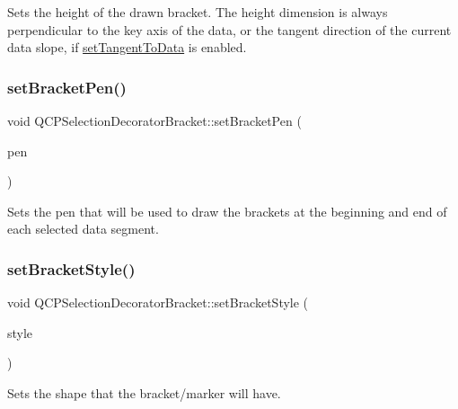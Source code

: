 Sets the height of the drawn bracket. The height dimension is always perpendicular to the key axis of the data, or the tangent direction of the current data slope, if \hyperlink{class_q_c_p_selection_decorator_bracket_a93bc6086e53a5e40a08641a7b2e2cdd5}{set\+Tangent\+To\+Data} is enabled. \mbox{\label{class_q_c_p_selection_decorator_bracket_ac0e392a6097990f8aa978932a8fa05d6}} 
\subsubsection{\texorpdfstring{set\+Bracket\+Pen()}{setBracketPen()}}
{\footnotesize\ttfamily void Q\+C\+P\+Selection\+Decorator\+Bracket\+::set\+Bracket\+Pen (\begin{DoxyParamCaption}\item[{const Q\+Pen \&}]{pen }\end{DoxyParamCaption})}

Sets the pen that will be used to draw the brackets at the beginning and end of each selected data segment. \mbox{\label{class_q_c_p_selection_decorator_bracket_a04507697438f6ad8cc2aeea5422dcbe5}} 
\subsubsection{\texorpdfstring{set\+Bracket\+Style()}{setBracketStyle()}}
{\footnotesize\ttfamily void Q\+C\+P\+Selection\+Decorator\+Bracket\+::set\+Bracket\+Style (\begin{DoxyParamCaption}\item[{\hyperlink{class_q_c_p_selection_decorator_bracket_aa6d18517ec0553575bbef0de4252336e}{Q\+C\+P\+Selection\+Decorator\+Bracket\+::\+Bracket\+Style}}]{style }\end{DoxyParamCaption})}

Sets the shape that the bracket/marker will have.

